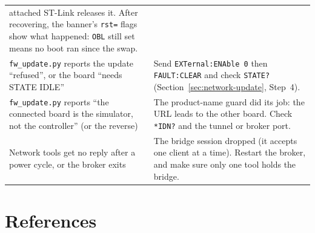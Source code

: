\documentclass[11pt]{article}
\newcommand{\code}[1]{\texttt{#1}}
\begin{document}
\begin{longtable}{p{1.7in} p{3in}}
    attached ST-Link releases it. After recovering, the banner's
    \code{rst=} flags show what happened: \code{OBL} still set means no
    boot ran since the swap. \\
  \code{fw\_update.py} reports the update ``refused'', or the
    board ``needs STATE IDLE'' &
    Send \code{EXTernal:ENAble 0} then \code{FAULT:CLEAR} and check
    \code{STATE?} (Section~\ref{sec:network-update}, Step~4). \\
  \code{fw\_update.py} reports ``the connected board is the
    simulator, not the controller'' (or the reverse) &
    The product-name guard did its job: the URL leads to the other
    board. Check \code{*IDN?} and the tunnel or broker port. \\
  Network tools get no reply after a power cycle, or the broker exits &
    The bridge session dropped (it accepts one client at a time).
    Restart the broker, and make sure only one tool holds the bridge. \\
  \hline
\end{longtable}

\section{References}
\end{document}
